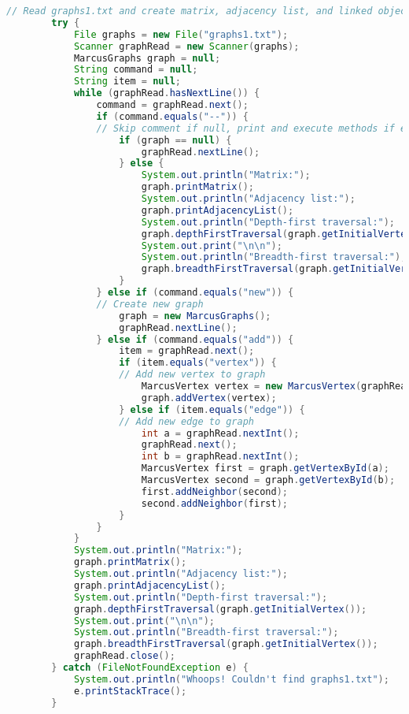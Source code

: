 \documentclass[letterpaper, 10pt]{article}
\begin{document}
\begin{lstlisting}[language=Java]
        // Read graphs1.txt and create matrix, adjacency list, and linked objects
        try {
            File graphs = new File("graphs1.txt");
            Scanner graphRead = new Scanner(graphs);
            MarcusGraphs graph = null;
            String command = null;
            String item = null;
            while (graphRead.hasNextLine()) {
                command = graphRead.next();
                if (command.equals("--")) {
                // Skip comment if null, print and execute methods if exists
                    if (graph == null) {
                        graphRead.nextLine();
                    } else {
                        System.out.println("Matrix:");
                        graph.printMatrix();
                        System.out.println("Adjacency list:");
                        graph.printAdjacencyList();
                        System.out.println("Depth-first traversal:");
                        graph.depthFirstTraversal(graph.getInitialVertex());
                        System.out.print("\n\n");
                        System.out.println("Breadth-first traversal:");
                        graph.breadthFirstTraversal(graph.getInitialVertex());
                    }
                } else if (command.equals("new")) {
                // Create new graph
                    graph = new MarcusGraphs();
                    graphRead.nextLine();
                } else if (command.equals("add")) {
                    item = graphRead.next();
                    if (item.equals("vertex")) {
                    // Add new vertex to graph
                        MarcusVertex vertex = new MarcusVertex(graphRead.nextInt());
                        graph.addVertex(vertex);
                    } else if (item.equals("edge")) {
                    // Add new edge to graph
                        int a = graphRead.nextInt();
                        graphRead.next();
                        int b = graphRead.nextInt();
                        MarcusVertex first = graph.getVertexById(a);
                        MarcusVertex second = graph.getVertexById(b);
                        first.addNeighbor(second);
                        second.addNeighbor(first);
                    }
                }
            }
            System.out.println("Matrix:");
            graph.printMatrix();
            System.out.println("Adjacency list:");
            graph.printAdjacencyList();
            System.out.println("Depth-first traversal:");
            graph.depthFirstTraversal(graph.getInitialVertex());
            System.out.print("\n\n");
            System.out.println("Breadth-first traversal:");
            graph.breadthFirstTraversal(graph.getInitialVertex());
            graphRead.close();
        } catch (FileNotFoundException e) {
            System.out.println("Whoops! Couldn't find graphs1.txt");
            e.printStackTrace();
        }


\end{lstlisting}
\end{document}
